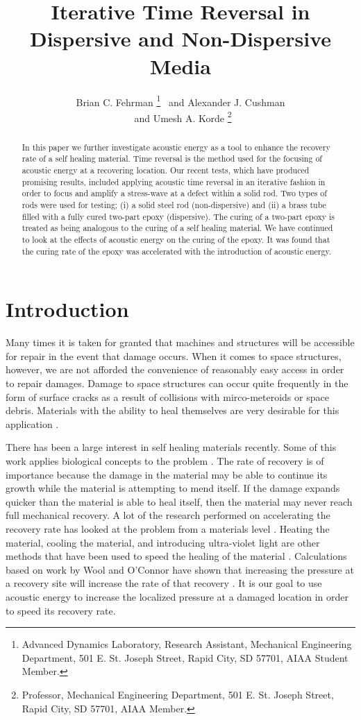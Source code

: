 \documentclass[]{aiaa-tc}%
\title{Iterative Time Reversal in Dispersive and Non-Dispersive Media}
\author{
  Brian C. Fehrman
    \thanks{Advanced Dynamics Laboratory, Research Assistant, Mechanical Engineering Department, 501 E. St. Joseph Street, Rapid
City, SD 57701, AIAA Student Member.}
  \ and Alexander J. Cushman \thanksibid{1}\\
  \ and Umesh A. Korde%
   \thanks{Professor, Mechanical Engineering Department, 501 E. St. Joseph Street, Rapid City, SD 57701, AIAA Member.}\\
 }
\begin{document}
\maketitle

\begin{abstract}
In this paper we further investigate acoustic energy as a tool to enhance the recovery rate of a self healing material. Time reversal is the method used for the focusing of acoustic energy at a recovering location. Our recent tests, which have produced promising results, included applying acoustic time reversal in an iterative fashion in order to focus and amplify a stress-wave at a defect within a solid rod. Two types of rods were used for testing; (i) a solid steel rod (non-dispersive) and (ii) a brass tube filled with a fully cured two-part epoxy (dispersive). The curing of a two-part epoxy is treated as being analogous to the curing of a self healing material. We have continued to look at the effects of acoustic energy on the curing of the epoxy. It was found that the curing rate of the epoxy was accelerated with the introduction of acoustic energy.
\end{abstract}


\section{Introduction}

Many times it is taken for granted that machines and structures will be accessible for repair in the event that damage occurs. When it comes to space structures, however, we are not afforded the convenience of reasonably easy access in order to repair damages. Damage to space structures can occur quite frequently in the form of surface cracks as a result of collisions with mirco-meteroids or space debris. Materials with the ability to heal themselves are very desirable for this application \cite{Lee2009}. 

There has been a large interest in self healing materials recently. Some of this work applies biological concepts to the problem \cite{Blaysik2010}. The rate of recovery is of importance because the damage in the material may be able to continue its growth while the material is attempting to mend itself. If the damage expands quicker than the material is able to heal itself, then the material may never reach full mechanical recovery.  A lot of the research performed on accelerating the recovery rate has looked at the problem from a materials level \cite{White2001, Sheng2009, Burattini2009, Nakao2009, Fettig2009, Imperiale2009, Zhang2007}. Heating the material, cooling the material, and introducing ultra-violet light are other methods that have been used to speed the healing of the material \cite{Sloof2009, Song2009, Bosman2009, Djugum2009, Murphy2009, Garcia2009}. Calculations based on work by Wool and O'Connor have shown that increasing the pressure at a recovery site will increase the rate of that recovery \cite{Wool1981, Barnes2009, Sarrazin2009}. It is our goal to use acoustic energy to increase the localized pressure at a damaged location in order to speed its recovery rate. 
\end{document}
